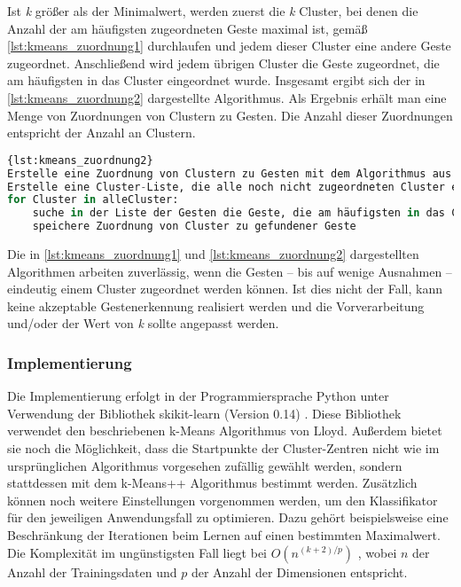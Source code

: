 Ist \emph{k} größer als der Minimalwert, werden zuerst die \emph{k} Cluster, bei denen die Anzahl der am häufigsten zugeordneten Geste maximal ist, gemäß 
\autoref{lst:kmeans_zuordnung1} durchlaufen und jedem dieser Cluster eine andere Geste zugeordnet. Anschließend wird jedem übrigen Cluster die Geste zugeordnet, die am häufigsten in das Cluster eingeordnet wurde.
Insgesamt ergibt sich der in \autoref{lst:kmeans_zuordnung2} dargestellte Algorithmus.  Als Ergebnis erhält man eine Menge von Zuordnungen von Clustern zu Gesten. Die Anzahl dieser Zuordnungen entspricht der Anzahl an Clustern.

\begin{lstlisting}[language=Python,caption={Zuordnung von Cluster-Zentrum zu Geste, Variante 2},label={lst:kmeans_zuordnung2}]{lst:kmeans_zuordnung2}
Erstelle eine Zuordnung von Clustern zu Gesten mit dem Algorithmus aus Quelltext 4.1
Erstelle eine Cluster-Liste, die alle noch nicht zugeordneten Cluster enthält
for Cluster in alleCluster:
    suche in der Liste der Gesten die Geste, die am häufigsten in das Cluster fällt
    speichere Zuordnung von Cluster zu gefundener Geste
\end{lstlisting}

Die in \autoref{lst:kmeans_zuordnung1} und \autoref{lst:kmeans_zuordnung2} dargestellten Algorithmen arbeiten
zuverlässig, wenn die Gesten -- bis auf wenige Ausnahmen -- eindeutig einem Cluster zugeordnet werden können. Ist dies nicht der Fall, kann keine akzeptable Gestenerkennung realisiert werden und die Vorverarbeitung und/oder der Wert von \emph{k} sollte angepasst werden.

\subsubsection{Implementierung} \label{subsubsec:kMeansImpl}
Die Implementierung erfolgt in der Programmiersprache Python unter Verwendung der Bibliothek skikit-learn (Version 0.14) \cite{sklearn}. Diese Bibliothek verwendet den beschriebenen k-Means Algorithmus von Lloyd. Außerdem bietet sie noch die Möglichkeit, dass die Startpunkte der Cluster-Zentren nicht wie im ursprünglichen Algorithmus vorgesehen zufällig gewählt werden, sondern stattdessen mit dem k-Means++ Algorithmus \cite{kMeans++} bestimmt werden. Zusätzlich können noch weitere 
Einstellungen vorgenommen werden, um den Klassifikator für den jeweiligen Anwendungsfall  zu optimieren. Dazu gehört beispielsweise eine Beschränkung der Iterationen beim Lernen auf einen bestimmten Maximalwert.
Die Komplexität im ungünstigsten Fall liegt bei $O(n^{(k+2)/p})$ \cite{sklearn.kmeans, kMeansHowSlow}, wobei $n$ der Anzahl der Trainingsdaten und $p$ der Anzahl der Dimensionen entspricht.

